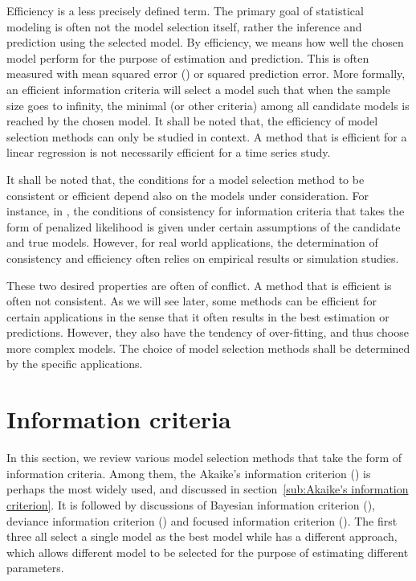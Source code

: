 Efficiency is a less precisely defined term. The primary goal of statistical
modeling is often not the model selection itself, rather the inference and
prediction using the selected model. By efficiency, we means how well the
chosen model perform for the purpose of estimation and prediction. This is
often measured with mean squared error (\mse) or squared prediction error.
More formally, an efficient information criteria will select a model such that
when the sample size goes to infinity, the minimal \mse (or other criteria)
among all candidate models is reached by the chosen model. It shall be noted
that, the efficiency of model selection methods can only be studied in
context. A method that is efficient for a linear regression is not necessarily
efficient for a time series study.

It shall be noted that, the conditions for a model selection method to be
consistent or efficient depend also on the models under consideration. For
instance, in \cite{Sin:1996vs}, the conditions of consistency for information
criteria that takes the form of penalized likelihood is given under certain
assumptions of the candidate and true models. However, for real world
applications, the determination of consistency and efficiency often relies on
empirical results or simulation studies.

These two desired properties are often of conflict. A method that is efficient
is often not consistent. As we will see later, some methods can be efficient
for certain applications in the sense that it often results in the best
estimation or predictions. However, they also have the tendency of
over-fitting, and thus choose more complex models. The choice of model
selection methods shall be determined by the specific applications.

\section{Information criteria}
\label{sec:Information criteria}

In this section, we review various model selection methods that take the form
of information criteria. Among them, the Akaike's information criterion (\aic)
is perhaps the most widely used, and discussed in section~\ref{sub:Akaike's
  information criterion}. It is followed by discussions of Bayesian
information criterion (\bic), deviance information criterion (\dic) and
focused information criterion (\fic). The first three all select a single
model as the best model while \fic has a different approach, which allows
different model to be selected for the purpose of estimating different
parameters.

